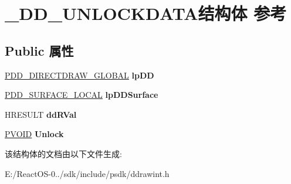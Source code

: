 \hypertarget{struct___d_d___u_n_l_o_c_k_d_a_t_a}{}\section{\+\_\+\+D\+D\+\_\+\+U\+N\+L\+O\+C\+K\+D\+A\+T\+A结构体 参考}
\label{struct___d_d___u_n_l_o_c_k_d_a_t_a}
\subsection*{Public 属性}
\begin{DoxyCompactItemize}
\item 
\mbox{\label{struct___d_d___u_n_l_o_c_k_d_a_t_a_a65d1c63a9bd7bba8b2bb269edd839930}} 
\hyperlink{struct___d_d___d_i_r_e_c_t_d_r_a_w___g_l_o_b_a_l}{P\+D\+D\+\_\+\+D\+I\+R\+E\+C\+T\+D\+R\+A\+W\+\_\+\+G\+L\+O\+B\+AL} {\bfseries lp\+DD}
\item 
\mbox{\label{struct___d_d___u_n_l_o_c_k_d_a_t_a_aab25178c08a42142dfeb7789906dd330}} 
\hyperlink{struct___d_d___s_u_r_f_a_c_e___l_o_c_a_l}{P\+D\+D\+\_\+\+S\+U\+R\+F\+A\+C\+E\+\_\+\+L\+O\+C\+AL} {\bfseries lp\+D\+D\+Surface}
\item 
\mbox{\label{struct___d_d___u_n_l_o_c_k_d_a_t_a_a45d05aa3104aa3255d6b4212a8dffe1e}} 
H\+R\+E\+S\+U\+LT {\bfseries dd\+R\+Val}
\item 
\mbox{\label{struct___d_d___u_n_l_o_c_k_d_a_t_a_abd4282011dd2d4bfe3564470da3321b4}} 
\hyperlink{interfacevoid}{P\+V\+O\+ID} {\bfseries Unlock}
\end{DoxyCompactItemize}


该结构体的文档由以下文件生成\+:\begin{DoxyCompactItemize}
\item 
E\+:/\+React\+O\+S-\/0../sdk/include/psdk/ddrawint.\+h\end{DoxyCompactItemize}
